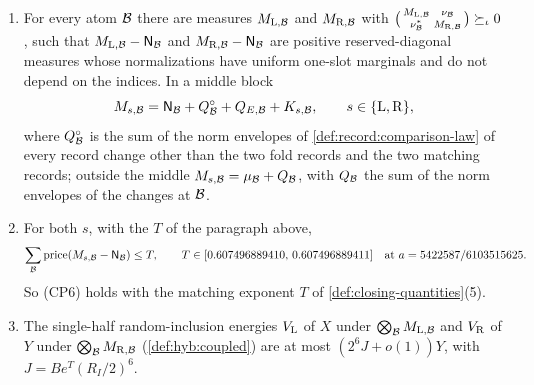 \begin{proposition}
\label{prop:record:matching}
\leavevmode
\begin{enumerate}[label=(\roman*)]
\item For every atom $\mathcal B$ there are measures $M_{{\rm L},\mathcal B}$ and
 $M_{{\rm R},\mathcal B}$ with $\bigl(\begin{smallmatrix}M_{{\rm L},\mathcal B}&\nu_\mathcal B\\
 \nu_\mathcal B^*&M_{{\rm R},\mathcal B}\end{smallmatrix}\bigr)\succeq_\iota0$, such that
 $M_{{\rm L},\mathcal B}-\mathsf N_\mathcal B$ and $M_{{\rm R},\mathcal B}-\mathsf N_\mathcal B$ are positive
 reserved-diagonal measures whose normalizations have uniform one-slot
 marginals and do not depend on the indices. In a middle block
 \[
  M_{s,\mathcal B}=\mathsf N_\mathcal B+Q^\circ_\mathcal B+Q_{E,\mathcal B}+K_{s,\mathcal B},\qquad s\in\{{\rm L},{\rm R}\},
 \]
 where $Q^\circ_\mathcal B$ is the sum of the norm envelopes of
 \cref{def:record:comparison-law} of every record change other than the two
 fold records and the two matching records; outside the middle
 $M_{s,\mathcal B}=\mu_\mathcal B+Q_\mathcal B$, with $Q_\mathcal B$ the sum of the norm envelopes of the
 changes at $\mathcal B$.
\item For both $s$, with the $T$ of the paragraph above,
 \[
  \sum_\mathcal B\operatorname{price}(M_{s,\mathcal B}-\mathsf N_\mathcal B)\le T,\qquad
  T\in[0.607496889410,\,0.607496889411]\quad\text{at }a=5422587/6103515625.
 \]
 So (CP6) holds with the matching exponent $T$ of
 \cref{def:closing-quantities}(5).
\item The single-half random-inclusion energies $V_{\rm L}$ of $X$ under
 $\bigotimes_\mathcal B M_{{\rm L},\mathcal B}$ and $V_{\rm R}$ of $Y$ under
 $\bigotimes_\mathcal B M_{{\rm R},\mathcal B}$ (\cref{def:hyb:coupled}) are at most
 $(2^6J+o(1))Y$, with $J=Be^T(R_I/2)^6$.
\end{enumerate}
\end{proposition}

